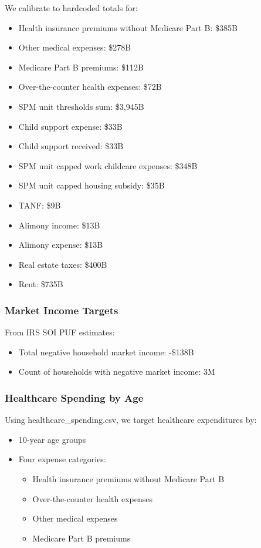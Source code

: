 We calibrate to hardcoded totals for:
\begin{itemize}
    \item Health insurance premiums without Medicare Part B: \$385B
    \item Other medical expenses: \$278B
    \item Medicare Part B premiums: \$112B
    \item Over-the-counter health expenses: \$72B
    \item SPM unit thresholds sum: \$3,945B
    \item Child support expense: \$33B
    \item Child support received: \$33B
    \item SPM unit capped work childcare expenses: \$348B
    \item SPM unit capped housing subsidy: \$35B
    \item TANF: \$9B
    \item Alimony income: \$13B
    \item Alimony expense: \$13B
    \item Real estate taxes: \$400B
    \item Rent: \$735B
\end{itemize}

\subsubsection{Market Income Targets}

From IRS SOI PUF estimates:
\begin{itemize}
    \item Total negative household market income: -\$138B
    \item Count of households with negative market income: 3M
\end{itemize}

\subsubsection{Healthcare Spending by Age}

Using healthcare\_spending.csv, we target healthcare expenditures by:
\begin{itemize}
    \item 10-year age groups
    \item Four expense categories:
    \begin{itemize}
        \item Health insurance premiums without Medicare Part B
        \item Over-the-counter health expenses
        \item Other medical expenses
        \item Medicare Part B premiums
    \end{itemize}
\end{itemize}

